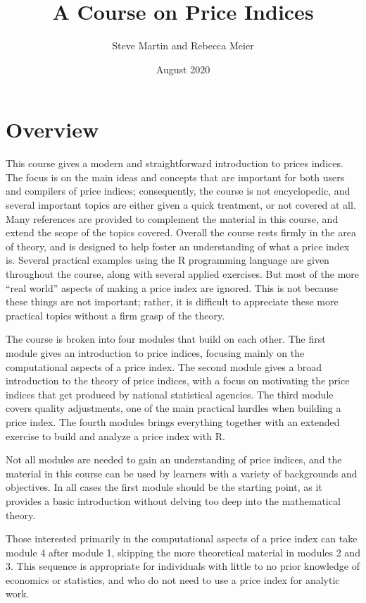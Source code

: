 \documentclass[]{article}
\title{A Course on Price Indices}
\author{Steve Martin and Rebecca Meier}
\date{August 2020}
\begin{document}
\maketitle

{
\setcounter{tocdepth}{2}
\tableofcontents
}
\hypertarget{overview}{%
\section*{Overview}\label{overview}}

This course gives a modern and straightforward introduction to prices indices. The focus is on the main ideas and concepts that are important for both users and compilers of price indices; consequently, the course is not encyclopedic, and several important topics are either given a quick treatment, or not covered at all. Many references are provided to complement the material in this course, and extend the scope of the topics covered. Overall the course rests firmly in the area of theory, and is designed to help foster an understanding of what a price index is. Several practical examples using the R programming language are given throughout the course, along with several applied exercises. But most of the more ``real world'' aspects of making a price index are ignored. This is not because these things are not important; rather, it is difficult to appreciate these more practical topics without a firm grasp of the theory.

The course is broken into four modules that build on each other. The first module gives an introduction to price indices, focusing mainly on the computational aspects of a price index. The second module gives a broad introduction to the theory of price indices, with a focus on motivating the price indices that get produced by national statistical agencies. The third module covers quality adjustments, one of the main practical hurdles when building a price index. The fourth modules brings everything together with an extended exercise to build and analyze a price index with R.

Not all modules are needed to gain an understanding of price indices, and the material in this course can be used by learners with a variety of backgrounds and objectives. In all cases the first module should be the starting point, as it provides a basic introduction without delving too deep into the mathematical theory.

Those interested primarily in the computational aspects of a price index can take module 4 after module 1, skipping the more theoretical material in modules 2 and 3. This sequence is appropriate for individuals with little to no prior knowledge of economics or statistics, and who do not need to use a price index for analytic work.
\end{document}

